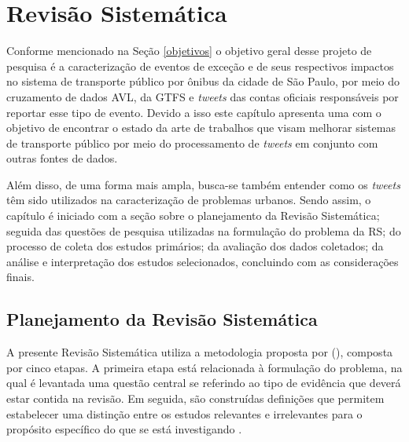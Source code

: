 \documentclass[
	12pt,				%
	oneside,			%
	a4paper,			%
	english,			%
	brazil				%
	]{abntex2ppgsi}
\begin{document}
{{{\chapter{Revisão Sistemática}
\label{revisao}
Conforme mencionado na Seção \ref{objetivos} o objetivo geral desse projeto de pesquisa é a caracterização de eventos de exceção e de seus respectivos impactos no sistema de transporte público por ônibus da cidade de São Paulo, por meio do cruzamento de dados AVL, da GTFS e \textit{tweets} das contas oficiais responsáveis por reportar esse tipo de evento. Devido a isso este capítulo apresenta uma  com o objetivo de encontrar o estado da arte de trabalhos que visam melhorar sistemas de transporte público por meio do processamento de \textit{tweets} em conjunto com outras fontes de dados.

Além disso, de uma forma mais ampla, busca-se também entender como os \textit{tweets} têm sido utilizados na caracterização de problemas urbanos. Sendo assim, o capítulo é iniciado com a seção sobre o planejamento da Revisão Sistemática; seguida das questões de pesquisa utilizadas na formulação do problema da RS; do processo de coleta dos estudos primários; da avaliação dos dados coletados; da análise e interpretação dos estudos selecionados, concluindo com as considerações finais.



\section{Planejamento da Revisão Sistemática}
\label{planejamento}
A presente Revisão Sistemática utiliza a metodologia proposta por \citeauthor{biolchini2005techincal} (\citeyear{biolchini2005techincal}), composta por cinco etapas.
A primeira etapa está relacionada à formulação do problema, na qual é levantada uma questão central se referindo ao tipo de evidência que deverá  estar contida na revisão. Em seguida, são construídas definições que permitem estabelecer uma distinção entre os estudos relevantes e irrelevantes para o propósito específico do que se está investigando \cite{biolchini2005techincal}.

}}}
\end{document}
